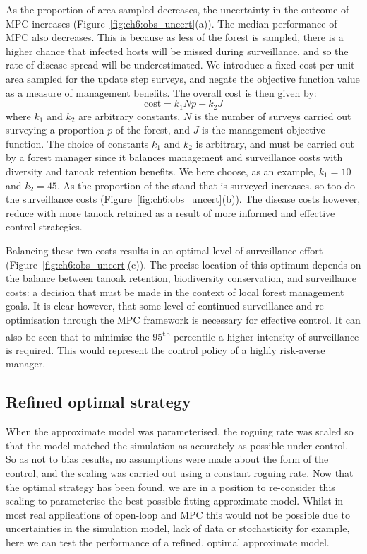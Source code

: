 As the proportion of area sampled decreases, the uncertainty in the outcome of MPC increases (Figure~\ref{fig:ch6:obs_uncert}(a)). The median performance of MPC also decreases. This is because as less of the forest is sampled, there is a higher chance that infected hosts will be missed during surveillance, and so the rate of disease spread will be underestimated. We introduce a fixed cost per unit area sampled for the update step surveys, and negate the objective function value as a measure of management benefits. The overall cost is then given by:
\begin{equation}
    \textrm{cost} = k_1Np - k_2J
\end{equation}
where $k_1$ and $k_2$ are arbitrary constants, $N$ is the number of surveys carried out surveying a proportion $p$ of the forest, and $J$ is the management objective function. The choice of constants $k_1$ and $k_2$ is arbitrary, and must be carried out by a forest manager since it balances management and surveillance costs with diversity and tanoak retention benefits. We here choose, as an example, $k_1= 10$ and $k_2 = 45$. As the proportion of the stand that is surveyed increases, so too do the surveillance costs (Figure~\ref{fig:ch6:obs_uncert}(b)). The disease costs however, reduce with more tanoak retained as a result of more informed and effective control strategies. 

Balancing these two costs results in an optimal level of surveillance effort (Figure~\ref{fig:ch6:obs_uncert}(c)). The precise location of this optimum depends on the balance between tanoak retention, biodiversity conservation, and surveillance costs: a decision that must be made in the context of local forest management goals. It is clear however, that some level of continued surveillance and re-optimisation through the MPC framework is necessary for effective control. It can also be seen that to minimise the 95\textsuperscript{th} percentile a higher intensity of surveillance is required. This would represent the control policy of a highly risk-averse manager.

\FloatBarrier
\newpage
\subsection{Refined optimal strategy\label{sec:ch6:refined_strat}}

When the approximate model was parameterised, the roguing rate was scaled so that the model matched the simulation as accurately as possible under control. So as not to bias results, no assumptions were made about the form of the control, and the scaling was carried out using a constant roguing rate. Now that the optimal strategy has been found, we are in a position to re-consider this scaling to parameterise the best possible fitting approximate model. Whilst in most real applications of open-loop and MPC this would not be possible due to uncertainties in the simulation model, lack of data or stochasticity for example, here we can test the performance of a refined, optimal approximate model.

